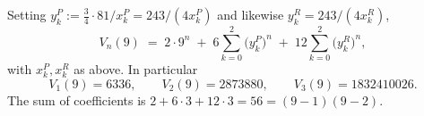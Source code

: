 \documentclass[11pt,reqno]{amsart}
\theoremstyle{remark}
\begin{document}
Setting $y^P_k := \tfrac34\cdot81/x^P_k = 243/(4x^P_k)$ and likewise $y^R_k=243/(4x^R_k)$,
\begin{equation}
V_n(9) \;=\; 2\cdot9^n \;+\; 6\sum_{k=0}^{2}\big(y_k^P\big)^{n} \;+\; 12\sum_{k=0}^{2}\big(y_k^R\big)^{n},
\end{equation}
with $x_k^P,x_k^R$ as above. In particular
\[
V_1(9)=6336, \qquad V_2(9)=2873880, \qquad V_3(9)=1832410026.
\]
The sum of coefficients is $2  + 6\cdot 3 + 12 \cdot 3  = 56 = (9-1)(9-2)$.

\end{document}
